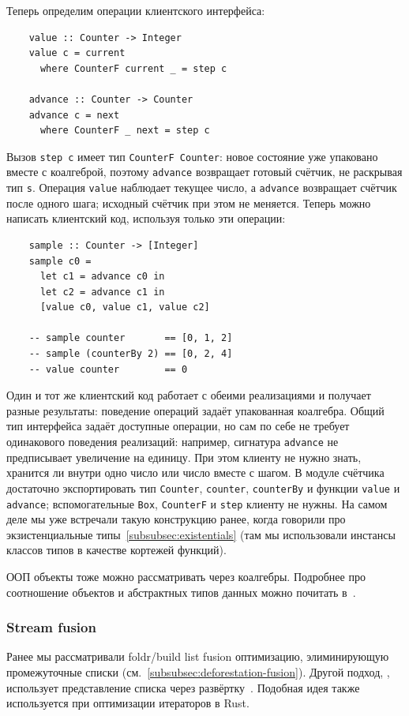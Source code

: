 Теперь определим операции клиентского интерфейса:
\begin{verbatim}
    value :: Counter -> Integer
    value c = current
      where CounterF current _ = step c

    advance :: Counter -> Counter
    advance c = next
      where CounterF _ next = step c
\end{verbatim}
Вызов \texttt{step c} имеет тип \texttt{CounterF Counter}: новое состояние уже упаковано вместе с коалгеброй, поэтому \texttt{advance} возвращает готовый счётчик, не раскрывая тип \texttt{s}.
Операция \texttt{value} наблюдает текущее число, а \texttt{advance} возвращает счётчик после одного шага; исходный счётчик при этом не меняется.
Теперь можно написать клиентский код, используя только эти операции:
\begin{verbatim}
    sample :: Counter -> [Integer]
    sample c0 =
      let c1 = advance c0 in
      let c2 = advance c1 in
      [value c0, value c1, value c2]

    -- sample counter       == [0, 1, 2]
    -- sample (counterBy 2) == [0, 2, 4]
    -- value counter        == 0
\end{verbatim}
Один и тот же клиентский код работает с обеими реализациями и получает разные результаты: поведение операций задаёт упакованная коалгебра.
Общий тип интерфейса задаёт доступные операции, но сам по себе не требует одинакового поведения реализаций: например, сигнатура \texttt{advance} не предписывает увеличение на единицу.
При этом клиенту не нужно знать, хранится ли внутри одно число или число вместе с шагом.
В модуле счётчика достаточно экспортировать тип \texttt{Counter}, \texttt{counter}, \texttt{counterBy} и функции \texttt{value} и \texttt{advance}; вспомогательные \texttt{Box}, \texttt{CounterF} и \texttt{step} клиенту не нужны.
На самом деле мы уже встречали такую конструкцию ранее, когда говорили про экзистенциальные типы~\ref{subsubsec:existentials} (там мы использовали инстансы классов типов в качестве кортежей функций).

ООП объекты тоже можно рассматривать через коалгебры.
Подробнее про соотношение объектов и абстрактных типов данных можно почитать в~\cite{cook2009understanding}.

\subsubsection{Stream fusion} \label{subsubsec:stream-fusion}

Ранее мы рассматривали foldr/build list fusion оптимизацию, элиминирующую промежуточные списки (см.~\ref{subsubsec:deforestation-fusion}).
Другой подход, , использует представление списка через развёртку~\cite{coutts2007stream}. Подобная идея также используется при оптимизации итераторов в Rust.

